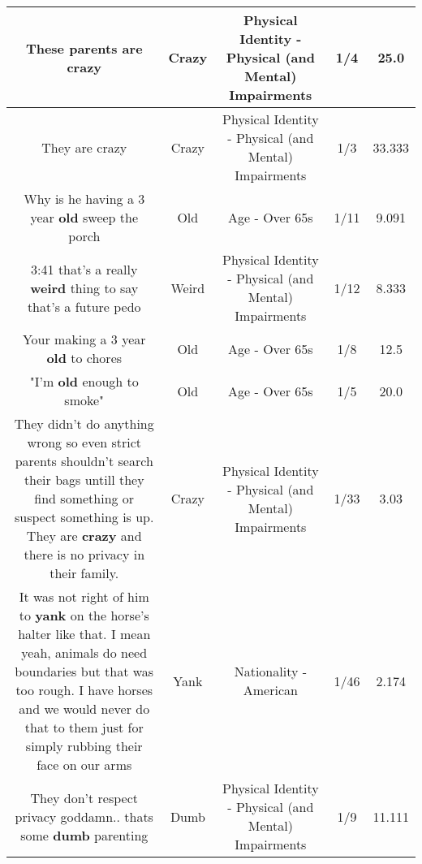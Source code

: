 \documentclass[11pt]{article}
\newlength\mylength
\begin{document}
\begin{center}
\begin{longtable}{|C{.65\mylength}|C{.30\mylength}|C{.12\mylength}|C{.12\mylength}|C{.12\mylength}|}
  \small These parents are crazy\normalsize   & Crazy & Physical Identity - Physical (and Mental) Impairments & 1/4 & 25.0 \\  \hline
  \small They are crazy\normalsize   & Crazy & Physical Identity - Physical (and Mental) Impairments & 1/3 & 33.333 \\  \hline
  \small Why is he having a 3 year \textbf{old} sweep the porch\normalsize   & Old & Age - Over 65s & 1/11 & 9.091 \\  \hline
  \small 3:41 that's a really \textbf{weird} thing to say that's a future pedo\normalsize   & Weird & Physical Identity - Physical (and Mental) Impairments & 1/12 & 8.333 \\  \hline
  \small Your making a 3 year \textbf{old} to chores\normalsize   & Old & Age - Over 65s & 1/8 & 12.5 \\  \hline
  \small "I'm \textbf{old} enough to smoke"\normalsize   & Old & Age - Over 65s & 1/5 & 20.0 \\  \hline
  \small They didn't do anything wrong so even strict parents shouldn't search their bags untill they find something or suspect something is up. They are \textbf{crazy} and there is no privacy in their family.\normalsize   & Crazy & Physical Identity - Physical (and Mental) Impairments & 1/33 & 3.03 \\  \hline
  \small It was not right of him to \textbf{yank} on the horse's halter like that. I mean yeah, animals do need boundaries but that was too rough. I have horses and we would never do that to them just for simply rubbing their face on our arms\normalsize   & Yank & Nationality - American & 1/46 & 2.174 \\  \hline
  \small They don't respect privacy goddamn.. thats some \textbf{dumb} parenting\normalsize   & Dumb & Physical Identity - Physical (and Mental) Impairments & 1/9 & 11.111 \\  \hline

\end{longtable}
\end{center}
\end{document}
